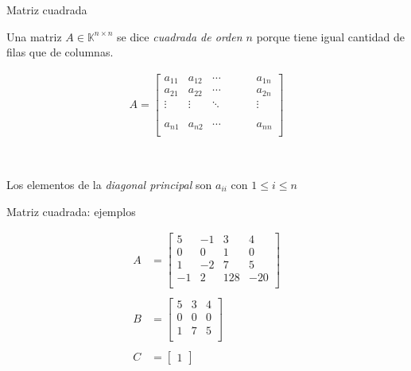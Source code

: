 \documentclass[handout]{beamer} %
\newcommand{\K}{\mathbb K}
\renewcommand{\_}[1]{_{\left[ #1 \right]}}
\renewcommand{\^}[1]{^{\left[ #1 \right]}}
\begin{document}
\begin{frame}{Matriz cuadrada}
    

        Una matriz {$A\in\K^{n\times n}$} se dice \textit{cuadrada de orden $n$} porque tiene igual cantidad de filas que de columnas.\pause

    \begin{align*}
        A=
        \left[
        \begin{array}{ccccccc}
            a_{11} & a_{12} & \cdots & & &  & a_{1n}\\ 
            a_{21} & a_{22} & \cdots & & &  & a_{2n}\\
            \vdots & \vdots & \ddots & & &  & \vdots\\
            & &  & & &  \\
            & &  & & &  \\
            a_{n1} & a_{n2} & \cdots & & & & a_{nn}\\ 
        \end{array}
        \right]
    \end{align*}
    
    \
    
    Los elementos de la \textit{diagonal principal} son $a_{ii}$ con $1\leq i\leq n$
\end{frame}


\begin{frame}{Matriz cuadrada: ejemplos}
    


\begin{align*}
    A&=
    \begin{bmatrix}
        5 & -1 & 3 & 4\\ 
        0 & 0 & 1 & 0\\
        1&-2 & 7 & 5 \\
        -1&2 & 128 & -20 \\
    \end{bmatrix}
    \\
&
    \\
    B&=
    \begin{bmatrix}
        5 &  3 & 4\\ 
        0 & 0  & 0\\
        1& 7 & 5 \\
    \end{bmatrix}
    \\
&
    \\
    C&=
    \begin{bmatrix}
        1
    \end{bmatrix}
\end{align*}
\vskip 1cm

\end{frame}
\end{document}
